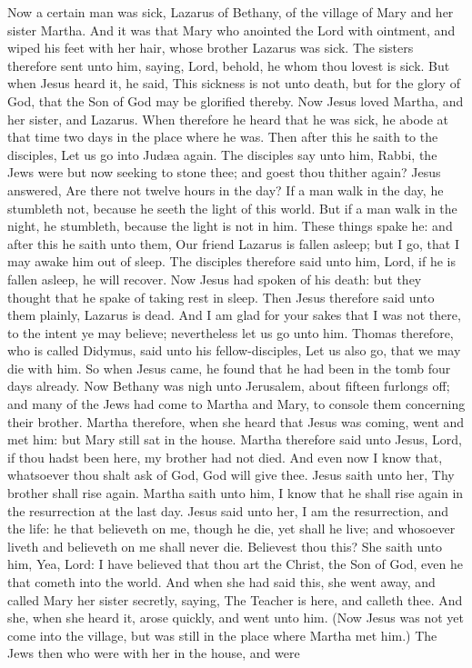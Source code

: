 Now a certain man was sick, Lazarus of Bethany, of the village of Mary and her sister Martha. And it was that Mary who anointed the Lord with ointment, and wiped his feet with her hair, whose brother Lazarus was sick. The sisters therefore sent unto him, saying, Lord, behold, he whom thou lovest is sick. But when Jesus heard it, he said, This sickness is not unto death, but for the glory of God, that the Son of God may be glorified thereby. Now Jesus loved Martha, and her sister, and Lazarus. When therefore he heard that he was sick, he abode at that time two days in the place where he was. Then after this he saith to the disciples, Let us go into Judæa again. The disciples say unto him, Rabbi, the Jews were but now seeking to stone thee; and goest thou thither again? Jesus answered, Are there not twelve hours in the day? If a man walk in the day, he stumbleth not, because he seeth the light of this world. But if a man walk in the night, he stumbleth, because the light is not in him. These things spake he: and after this he saith unto them, Our friend Lazarus is fallen asleep; but I go, that I may awake him out of sleep. The disciples therefore said unto him, Lord, if he is fallen asleep, he will recover. Now Jesus had spoken of his death: but they thought that he spake of taking rest in sleep. Then Jesus therefore said unto them plainly, Lazarus is dead. And I am glad for your sakes that I was not there, to the intent ye may believe; nevertheless let us go unto him. Thomas therefore, who is called Didymus, said unto his fellow-disciples, Let us also go, that we may die with him.  So when Jesus came, he found that he had been in the tomb four days already. Now Bethany was nigh unto Jerusalem, about fifteen furlongs off; and many of the Jews had come to Martha and Mary, to console them concerning their brother. Martha therefore, when she heard that Jesus was coming, went and met him: but Mary still sat in the house. Martha therefore said unto Jesus, Lord, if thou hadst been here, my brother had not died. And even now I know that, whatsoever thou shalt ask of God, God will give thee. Jesus saith unto her, Thy brother shall rise again. Martha saith unto him, I know that he shall rise again in the resurrection at the last day. Jesus said unto her, I am the resurrection, and the life: he that believeth on me, though he die, yet shall he live; and whosoever liveth and believeth on me shall never die. Believest thou this? She saith unto him, Yea, Lord: I have believed that thou art the Christ, the Son of God, even he that cometh into the world. And when she had said this, she went away, and called Mary her sister secretly, saying, The Teacher is here, and calleth thee. And she, when she heard it, arose quickly, and went unto him. (Now Jesus was not yet come into the village, but was still in the place where Martha met him.) The Jews then who were with her in the house, and were 